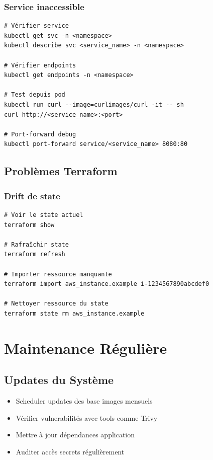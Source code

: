 \documentclass[12pt,a4paper]{report}
\begin{document}
\subsubsection{Service inaccessible}

\lstset{language=bash}
\begin{lstlisting}
# Vérifier service
kubectl get svc -n <namespace>
kubectl describe svc <service_name> -n <namespace>

# Vérifier endpoints
kubectl get endpoints -n <namespace>

# Test depuis pod
kubectl run curl --image=curlimages/curl -it -- sh
curl http://<service_name>:<port>

# Port-forward debug
kubectl port-forward service/<service_name> 8080:80
\end{lstlisting}

\subsection{Problèmes Terraform}

\subsubsection{Drift de state}

\lstset{language=bash}
\begin{lstlisting}
# Voir le state actuel
terraform show

# Rafraîchir state
terraform refresh

# Importer ressource manquante
terraform import aws_instance.example i-1234567890abcdef0

# Nettoyer ressource du state
terraform state rm aws_instance.example
\end{lstlisting}

\section{Maintenance Régulière}

\subsection{Updates du Système}

\begin{itemize}
    \item Scheduler updates des base images mensuels
    \item Vérifier vulnerabilités avec tools comme Trivy
    \item Mettre à jour dépendances application
    \item Auditer accès secrets régulièrement
\end{itemize}
\end{document}
